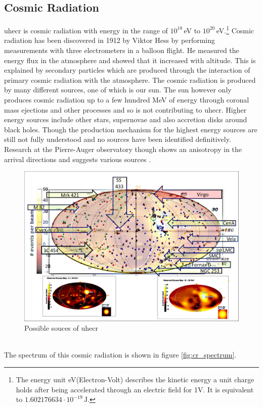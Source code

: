 \documentclass[abstract,toc,los,lof,english,10pt,glossary,acronyms]{jluthesis}
\begin{document}
\subsection{Cosmic Radiation}
\acrfull{uhecr} is cosmic radiation with energy in the range of $10^{18}$\,eV to $10^{20}$\,eV.\footnote{The energy unit eV(Electron-Volt) describes the kinetic energy a unit charge holds after being accelerated through an electric field for 1V. It is equivalent to $1.602176634\cdot10^{-19}\,\text{J}$.}
Cosmic radiation has been discovered in 1912 by Viktor Hess by performing measurements with three electrometers in a balloon flight. He measured the energy flux in the atmosphere and showed that it increased with altitude. This is explained by secondary particles which are produced through the interaction of primary cosmic radiation with the atmosphere. The cosmic radiation is produced by many different sources, one of which is our sun. The sun however only produces cosmic radiation up to a few hundred MeV of energy through coronal mass ejections and other processes and so is not contributing to \acrshort{uhecr}. Higher energy sources include other stars, supernovae and also accretion disks around black holes. Though the production mechanism for the highest energy sources are still not fully understood and no sources have been identified definitively. Research at the Pierre-Auger observatory though shows an anisotropy in the arrival directions and suggests various sources \cite{fargion2018ultra}.
\begin{figure}[ht!]
	\centering
	\includegraphics[width=0.5\linewidth]{data/uhecr-sources}
	\caption{Possible souces of \acrshort{uhecr} \cite{fargion2018ultra}}
	\label{fig:uhecr-sources}
\end{figure} \\
The spectrum of this cosmic radiation is shown in figure \ref{fig:cr_spectrum}.
\end{document}
